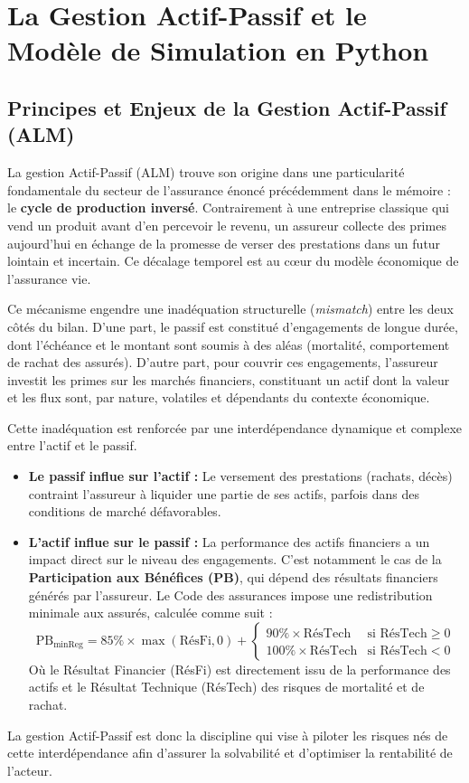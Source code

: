 \chapter{La Gestion Actif-Passif et le Modèle de Simulation en Python}

\section{Principes et Enjeux de la Gestion Actif-Passif (ALM)}
La gestion Actif-Passif (ALM) trouve son origine dans une particularité fondamentale du secteur de l'assurance énoncé précédemment dans le mémoire : le \textbf{cycle de production inversé}. Contrairement à une entreprise classique qui vend un produit avant d'en percevoir le revenu, un assureur collecte des primes aujourd'hui en échange de la promesse de verser des prestations dans un futur lointain et incertain. Ce décalage temporel est au cœur du modèle économique de l'assurance vie.

Ce mécanisme engendre une inadéquation structurelle (\textit{mismatch}) entre les deux côtés du bilan. D'une part, le passif est constitué d'engagements de longue durée, dont l'échéance et le montant sont soumis à des aléas (mortalité, comportement de rachat des assurés). D'autre part, pour couvrir ces engagements, l'assureur investit les primes sur les marchés financiers, constituant un actif dont la valeur et les flux sont, par nature, volatiles et dépendants du contexte économique.

Cette inadéquation est renforcée par une interdépendance dynamique et complexe entre l'actif et le passif.

\begin{itemize}
    \item \textbf{Le passif influe sur l'actif :} Le versement des prestations (rachats, décès) contraint l'assureur à liquider une partie de ses actifs, parfois dans des conditions de marché défavorables.
    \item \textbf{L'actif influe sur le passif :} La performance des actifs financiers a un impact direct sur le niveau des engagements. C'est notamment le cas de la \textbf{Participation aux Bénéfices (PB)}, qui dépend des résultats financiers générés par l'assureur. Le Code des assurances impose une redistribution minimale aux assurés, calculée comme suit :
    \begin{equation}
        \label{eq:pb_minReg}
        \text{PB}_{\text{minReg}} = 85\% \times \max(\text{RésFi}, 0) + 
        \begin{cases}
            90\% \times \text{RésTech} & \text{si RésTech} \ge 0 \\
            100\% \times \text{RésTech} & \text{si RésTech} < 0
        \end{cases}
    \end{equation}
    Où le Résultat Financier (RésFi) est directement issu de la performance des actifs et le Résultat Technique (RésTech) des risques de mortalité et de rachat.
\end{itemize}
La gestion Actif-Passif est donc la discipline qui vise à piloter les risques nés de cette interdépendance afin d'assurer la solvabilité et d'optimiser la rentabilité de l'acteur.

